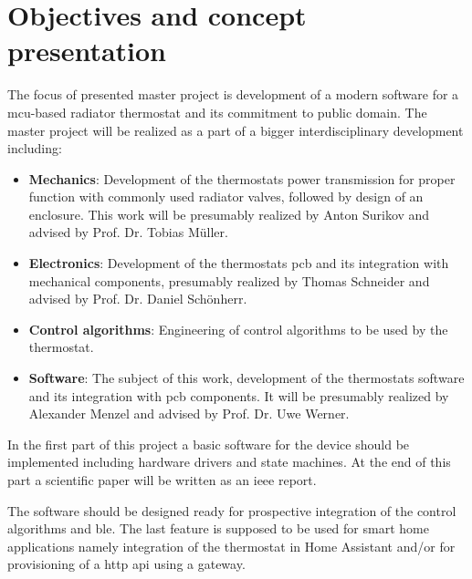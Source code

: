 %
%

\chapter{Objectives and concept presentation}
\label{chap:Objectives and concept presentation}
%
The focus of presented master project is development of a modern software for a \ac{mcu}-based radiator thermostat and its commitment to public domain. The master project will be realized as a part of a bigger interdisciplinary development including:

\begin{itemize}
	\item \textbf{Mechanics}: Development of the thermostats power transmission for proper function with commonly used radiator valves, followed by design of an enclosure. This work will be presumably realized by Anton Surikov and advised by Prof. Dr. Tobias Müller.
	\item \textbf{Electronics}: Development of the thermostats \ac{pcb} and its integration with mechanical components, presumably realized by Thomas Schneider and advised by Prof. Dr. Daniel Schönherr.
	\item \textbf{Control algorithms}: Engineering of control algorithms to be used by the thermostat.
	\item \textbf{Software}: The subject of this work, development of the thermostats software and its integration with \acs{pcb} components. It will be presumably realized by Alexander Menzel and advised by Prof. Dr. Uwe Werner.
\end{itemize}

In the first part of this project a basic software for the device should be implemented including hardware drivers and state machines. At the end of this part a scientific paper will be written as an \ac{ieee} report.

The software should be designed ready for prospective integration of the control algorithms and \ac{ble}. The last feature is supposed to be used for smart home applications namely integration of the thermostat in Home Assistant and/or for provisioning of a \ac{http} \ac{api} using a gateway.

